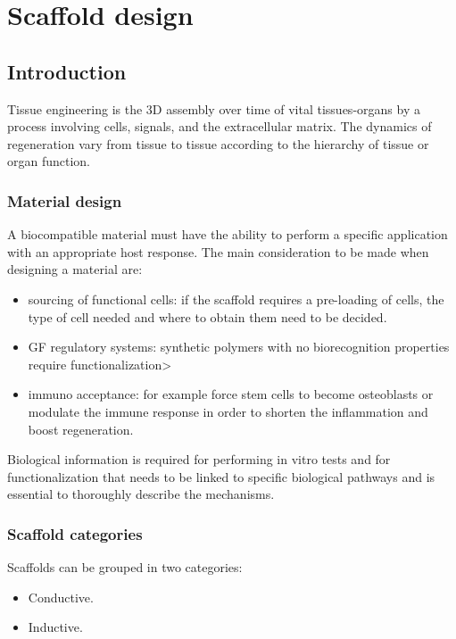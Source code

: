 \graphicspath{{chapters/08/images/}}
\chapter{Scaffold design}

\section{Introduction}
Tissue engineering is the 3D assembly over time of vital tissues-organs by a process involving cells, signals, and the extracellular matrix.
The dynamics of regeneration vary from tissue to tissue according to the hierarchy of tissue or organ function.

    \subsection{Material design}
    A biocompatible material must have the ability to perform a specific application with an appropriate host response.
    The main consideration to be made when designing a material are:

    \begin{multicols}{2}
        \begin{itemize}
            \item sourcing of functional cells: if the scaffold requires a pre-loading of cells, the type of cell needed and where to obtain them need to be decided.
            \item GF regulatory systems: synthetic polymers with no biorecognition properties require functionalization>
            \item immuno acceptance:  for example force stem cells to become osteoblasts or modulate the immune response in order to shorten the inflammation and boost regeneration.
        \end{itemize}
    \end{multicols}

    Biological information is required for performing in vitro tests and for functionalization that needs to be linked to specific biological pathways and is essential to thoroughly describe the mechanisms.

    \subsection{Scaffold categories}
    Scaffolds can be grouped in two categories:

    \begin{multicols}{2}
        \begin{itemize}
            \item Conductive.
            \item Inductive.
        \end{itemize}
    \end{multicols}

